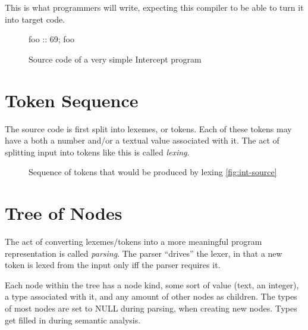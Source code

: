 \documentclass[12pt]{article}
\begin{document}
This is what programmers will write, expecting this compiler to be able to turn it into target code.

\begin{figure}[h]
  \centering
  foo :: 69; foo
  \caption{Source code of a very simple Intercept program}
  \label{fig:int-source}
\end{figure}
\FloatBarrier

\section{Token Sequence}
\label{sec:tokens}

The source code is first split into lexemes, or tokens. Each of these tokens may have a both a number and/or a textual value associated with it. The act of splitting input into tokens like this is called \emph{lexing}.

\begin{figure}[h]
  \centering
  \caption{Sequence of tokens that would be produced by lexing \autoref{fig:int-source}}
  \label{fig:int-tokens}
\end{figure}
\FloatBarrier

\section{Tree of Nodes}
\label{sec:node-tree}

The act of converting lexemes/tokens into a more meaningful program representation is called \emph{parsing}. The parser ``drives'' the lexer, in that a new token is lexed from the input only iff the parser requires it.

Each node within the tree has a node kind, some sort of value (text, an integer), a type associated with it, and any amount of other nodes as children. The types of most nodes are set to NULL during parsing, when creating new nodes. Types get filled in during semantic analysis.
\end{document}
